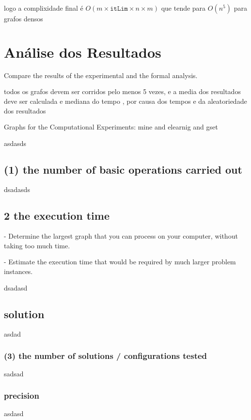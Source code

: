 \documentclass[mirror, portugues]{revdetua}
\begin{document}
logo a complixidade final é $O(m \times \texttt{itLim} \times n \times m)$ que tende para $O(n^5)$ para grafos densos


\section{Análise dos Resultados}

Compare the results of the experimental and the formal analysis.

todos os grafos devem ser corridos pelo menos 5 vezes, e a media dos resultados deve ser calculada e mediana do tempo , por causa dos tempos e da aleatoriedade dos resultados

Graphs for the Computational Experiments: mine and elearnig and gset

asdasds

\subsection{(1) the number of basic operations carried out}

dsadasds

\subsection{2 the execution time }

- Determine the largest graph that you can process on your computer, without taking too much time.

- Estimate the execution time that would be required by much larger problem instances.

dsadasd

\subsection{solution}

asdad

\subsubsection{(3) the number of solutions / configurations tested}

sadsad

\subsubsection{precision}

asdasd




\end{document}
